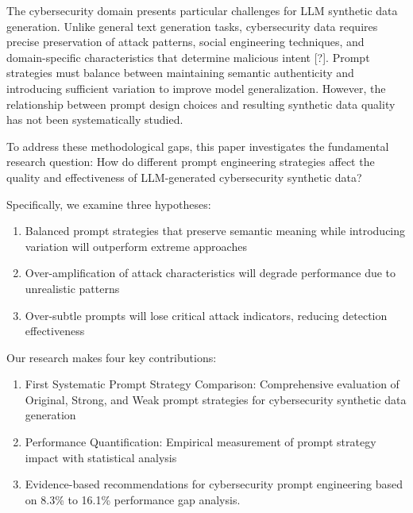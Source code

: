 The cybersecurity domain presents particular challenges for LLM synthetic data generation. Unlike general text generation tasks, cybersecurity data requires precise preservation of attack patterns, social engineering techniques, and domain-specific characteristics that determine malicious intent [?]. Prompt strategies must balance between maintaining semantic authenticity and introducing sufficient variation to improve model generalization. However, the relationship between prompt design choices and resulting synthetic data quality has not been systematically studied.

To address these methodological gaps, this paper investigates the fundamental research question: How do different prompt engineering strategies affect the quality and effectiveness of LLM-generated cybersecurity synthetic data?

Specifically, we examine three hypotheses:
\begin{enumerate}
    \item Balanced prompt strategies that preserve semantic meaning while introducing variation will outperform extreme approaches
    \item Over-amplification of attack characteristics will degrade performance due to unrealistic patterns
    \item Over-subtle prompts will lose critical attack indicators, reducing detection effectiveness
\end{enumerate}

Our research makes four key contributions:
\begin{enumerate}
    \item First Systematic Prompt Strategy Comparison: Comprehensive evaluation of Original, Strong, and Weak prompt strategies for cybersecurity synthetic data generation
    \item Performance Quantification: Empirical measurement of prompt strategy impact with statistical analysis
    \item Evidence-based recommendations for cybersecurity prompt engineering based on 8.3\% to 16.1\% performance gap analysis.
\end{enumerate}